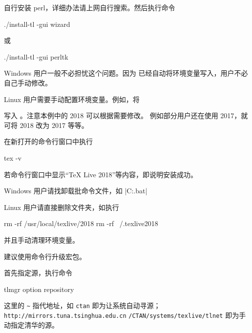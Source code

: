 
自行安装 perl，详细办法请上网自行搜索。然后执行命令
\begin{shcode}
  ./install-tl -gui wizard
\end{shcode}
或
\begin{shcode}
  ./install-tl -gui perltk
\end{shcode}



Windows 用户一般不必担忧这个问题。因为 \TeXLive{} 已经自动将环境变量写入，用户不必自己手动修改。

Linux 用户需要手动配置环境变量。例如，将

写入 。注意本例中的 2018 可以根据需要修改。
例如部分用户还在使用 \TeXLive{} 2017，就可将 2018 改为 2017 等等。



在新打开的命令行窗口中执行
\begin{shcode}
  tex -v
\end{shcode}
若命令行窗口中显示“TeX Live 2018”等内容，即说明安装成功。



Windows 用户请找卸载批命令文件，如 |C:\texlive{}\tlpkg\installer\uninst.bat|

Linux 用户请直接删除文件夹，如执行
\begin{shcode}
  rm -rf /usr/local/texlive/2018
  rm -rf ~/.texlive2018
\end{shcode}
并且手动清理环境变量。


建议使用命令行升级宏包。

首先指定源，执行命令
\begin{shcode}
  tlmgr option repository ~
\end{shcode}
这里的 \verb|~| 指代地址，如 \verb|ctan| 即为让系统自动寻源；
\verb|http://mirrors.tuna.tsinghua.edu.cn| 
\verb|/CTAN/systems/texlive/tlnet| 即为手动指定清华的源。

